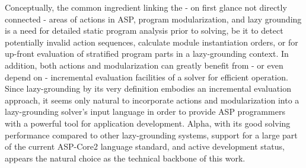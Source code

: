 Conceptually, the common ingredient linking the - on first glance not directly connected - areas of actions in ASP, program modularization, and lazy grounding is a need for detailed static program analysis prior to solving, be it to detect potentially invalid action sequences, calculate module instantiation orders, or for up-front evaluation of stratified program parts in a lazy-grounding context. In addition, both actions and modularization can greatly benefit from - or even depend on - incremental evaluation facilities of a solver for efficient operation. Since lazy-grounding by its very definition embodies an incremental evaluation approach, it seems only natural to incorporate actions and modularization into a lazy-grounding solver's input language in order to provide ASP programmers with a powerful tool for application development. Alpha, with its good solving performance compared to other lazy-grounding systems, support for a large part of the current ASP-Core2 language standard, and active development status, appears the natural choice as the technical backbone of this work.
